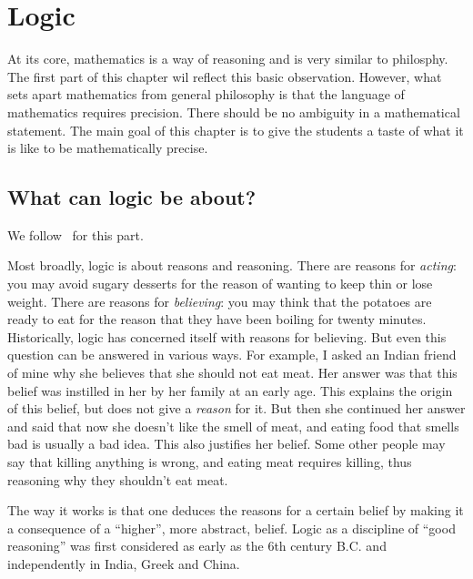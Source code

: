 \chapter{Logic}



At its core, mathematics is a way of reasoning and is very similar to philosphy.
The first part of this chapter wil reflect this basic observation.
However, what sets apart mathematics from general philosophy is that 
the language of mathematics requires precision. 
There should be no ambiguity in a mathematical statement.
The main goal of this chapter 
is to give the students a taste of what it is like to be mathematically
precise.

\section{What can logic be about?}
We follow~\cite{Sainsbury1991} for this part.

Most broadly, logic is about reasons and reasoning. There are reasons for
\textit{acting}: you may avoid sugary desserts for the reason of wanting to keep thin or lose weight. There are reasons for 
\textit{believing}: you may think that the potatoes are ready to eat for the reason that they have been boiling for twenty minutes. 
Historically, logic has concerned itself with reasons for believing. 
But even this question can be answered in various ways. For example, I asked an Indian friend of mine why she believes that she should not eat meat. Her answer was that this belief was instilled in her by her family at an early age. This explains the origin of this belief, but does not give a \emph{reason} for it. But then she continued her answer and said that now she doesn't like the smell of meat, and eating food that smells bad is usually a bad idea. This also justifies her belief. Some other people may say that killing anything is wrong, and eating meat requires killing, thus reasoning why they shouldn't eat meat. 

The way it works is that one deduces the reasons for a certain belief by
making it a consequence of a ``higher'', more abstract, belief.
Logic as a discipline of ``good reasoning'' was first considered as early as the 6th century B.C. and independently in India, Greek and China.

